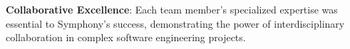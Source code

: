 \begin{successbox}
\textbf{Collaborative Excellence}: Each team member's specialized expertise was essential to Symphony's success, demonstrating the power of interdisciplinary collaboration in complex software engineering projects.
\end{successbox}






\clearpage
